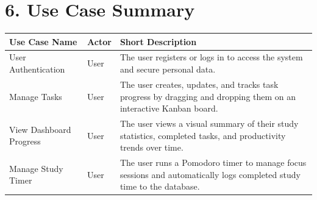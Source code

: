 \documentclass[12pt]{article}
\begin{document}
\section*{6. Use Case Summary}

\renewcommand{\arraystretch}{1.5}
\begin{xltabular}{\textwidth}{|l|l|X|}
\hline
\textbf{Use Case Name} & \textbf{Actor} & \textbf{Short Description} \\ \hline
User Authentication & User & The user registers or logs in to access the system and secure personal data. \\ \hline
Manage Tasks & User & The user creates, updates, and tracks task progress by dragging and dropping them on an interactive Kanban board. \\ \hline
View Dashboard Progress & User & The user views a visual summary of their study statistics, completed tasks, and productivity trends over time. \\ \hline
Manage Study Timer & User & The user runs a Pomodoro timer to manage focus sessions and automatically logs completed study time to the database. \\ \hline
\end{xltabular}
\end{document}
